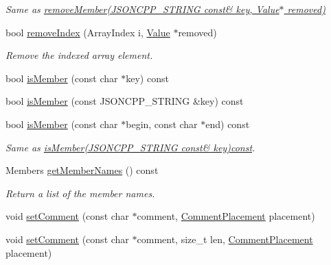 \begin{DoxyCompactItemize}
\begin{DoxyCompactList}\small\item\em Same as \hyperlink{classJson_1_1Value_ae385ecef98427970df525ee876e9f54a}{remove\+Member(\+J\+S\+O\+N\+C\+P\+P\+\_\+\+S\+T\+R\+I\+N\+G const\& key, Value$\ast$ removed)} \end{DoxyCompactList}\item 
bool \hyperlink{classJson_1_1Value_ae9e67e08a85a2f3be3396ec0f4c47f65}{remove\+Index} (Array\+Index i, \hyperlink{classJson_1_1Value}{Value} $\ast$removed)
\begin{DoxyCompactList}\small\item\em Remove the indexed array element. \end{DoxyCompactList}\item 
bool \hyperlink{classJson_1_1Value_a196defba501d70ea2b6793afb04108e3}{is\+Member} (const char $\ast$key) const 
\item 
bool \hyperlink{classJson_1_1Value_ab68c6bcc59930e517495013394c93c83}{is\+Member} (const J\+S\+O\+N\+C\+P\+P\+\_\+\+S\+T\+R\+I\+NG \&key) const 
\item 
bool \hyperlink{classJson_1_1Value_a077604b87a79d75543a1b5438eb9d8ab}{is\+Member} (const char $\ast$begin, const char $\ast$end) const \hypertarget{classJson_1_1Value_a077604b87a79d75543a1b5438eb9d8ab}{}\label{classJson_1_1Value_a077604b87a79d75543a1b5438eb9d8ab}

\begin{DoxyCompactList}\small\item\em Same as \hyperlink{classJson_1_1Value_ab68c6bcc59930e517495013394c93c83}{is\+Member(\+J\+S\+O\+N\+C\+P\+P\+\_\+\+S\+T\+R\+I\+N\+G const\& key)const}. \end{DoxyCompactList}\item 
Members \hyperlink{classJson_1_1Value_a30fa08af88f2d0a038b22ba9f4e88b2a}{get\+Member\+Names} () const 
\begin{DoxyCompactList}\small\item\em Return a list of the member names. \end{DoxyCompactList}\item 
void \hyperlink{classJson_1_1Value_a29f3a30f7e5d3af6f38d57999bf5b480}{set\+Comment} (const char $\ast$comment, \hyperlink{namespaceJson_a4fc417c23905b2ae9e2c47d197a45351}{Comment\+Placement} placement)
\item 
void \hyperlink{classJson_1_1Value_a2900152a2887b410a9ddabe278b9d492}{set\+Comment} (const char $\ast$comment, size\+\_\+t len, \hyperlink{namespaceJson_a4fc417c23905b2ae9e2c47d197a45351}{Comment\+Placement} placement)\hypertarget{classJson_1_1Value_a2900152a2887b410a9ddabe278b9d492}{}\label{classJson_1_1Value_a2900152a2887b410a9ddabe278b9d492}


\end{DoxyCompactItemize}
